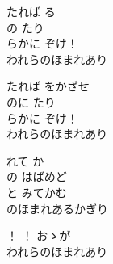 \documentclass[10pt,b5j]{tarticle} %
\begin{document}
\vspace{1.5em} %
\newcommand{\linespace}{0.5em} %
\newcommand{\blocksize}{0.5\hsize} %
\begin{enumerate} %
    \begin{minipage}[c]{\blocksize}
    
        \vspace{\linespace}
        \item
        たれば る\\
        の たり\\
        らかに ぞけ！\\
        われらのほまれあり
        
        \vspace{\linespace}
        \item
        たれば をかざせ\\
        のに たり\\
        らかに ぞけ！\\
        われらのほまれあり
        
        \vspace{\linespace}
        \item
        れて か\\
        の はばめど\\
        と みてかむ\\
        のほまれあるかぎり
        
        \vspace{\linespace}
        \item
        ！ ！ おゝが\\
        われらのほまれあり
    
    \end{minipage}
\end{enumerate} %
\end{document}
